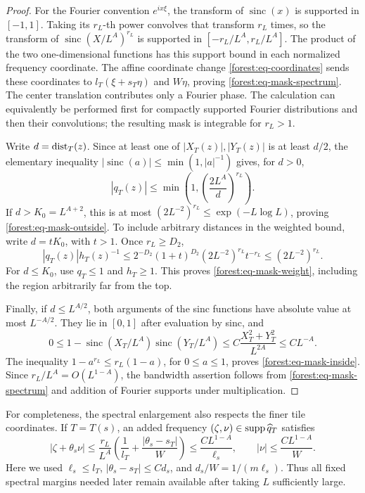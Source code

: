 \begin{proof}
For the Fourier convention \(e^{ix\xi}\), the transform of
\(\operatorname{sinc}(x)\) is supported in \([-1,1]\).
Taking its \(r_L\)-th power convolves that transform \(r_L\)
times, so the transform of
\(\operatorname{sinc}(X/L^A)^{r_L}\) is supported in
\([-r_L/L^A,r_L/L^A]\). The product of the two one-dimensional
functions has this support bound in each normalized frequency
coordinate. The affine coordinate change
\eqref{forest:eq-coordinates} sends these coordinates to
\(l_T(\xi+s_T\eta)\) and \(W\eta\), proving
\eqref{forest:eq-mask-spectrum}. The center translation contributes
only a Fourier phase. The calculation can equivalently be performed
first for compactly supported Fourier distributions and then their
convolutions; the resulting mask is integrable for \(r_L>1\).

Write \(d=\operatorname{dist}_T(z)\). Since at least one of
\(|X_T(z)|,|Y_T(z)|\) is at least \(d/2\), the elementary
inequality \(|\operatorname{sinc}(a)|\le\min(1,|a|^{-1})\)
gives, for \(d>0\),
\begin{equation}\label{forest:eq-mask-pointwise}
 |q_T(z)|\le\min\left(1,\left(\frac{2L^A}{d}\right)^{r_L}\right).
\end{equation}
If \(d>K_0=L^{A+2}\), this is at most
\((2L^{-2})^{r_L}\le\exp(-L\log L)\), proving
\eqref{forest:eq-mask-outside}. To include arbitrary distances in
the weighted bound, write \(d=tK_0\), with \(t>1\). Once
\(r_L\ge D_2\),
\[
 |q_T(z)|h_T(z)^{-1}
 \le 2^{-D_2}(1+t)^{D_2}
       (2L^{-2})^{r_L}t^{-r_L}
 \le (2L^{-2})^{r_L}.
\]
For \(d\le K_0\), use \(q_T\le1\) and \(h_T\ge1\).
This proves \eqref{forest:eq-mask-weight}, including the region
arbitrarily far from the top.

Finally, if \(d\le L^{A/2}\), both arguments of the sinc
functions have absolute value at most \(L^{-A/2}\). They lie
in \([0,1]\) after evaluation by sinc, and
\[
 0\le1-
   \operatorname{sinc}(X_T/L^A)
   \operatorname{sinc}(Y_T/L^A)
 \le C\frac{X_T^2+Y_T^2}{L^{2A}}
 \le C L^{-A}.
\]
The inequality \(1-a^{r_L}\le r_L(1-a)\), for
\(0\le a\le1\), proves \eqref{forest:eq-mask-inside}.
Since \(r_L/L^A=O(L^{1-A})\), the bandwidth assertion follows
from \eqref{forest:eq-mask-spectrum} and addition of Fourier
supports under multiplication.
\end{proof}

For completeness, the spectral enlargement also respects the finer
tile coordinates. If \(T=T(s)\), an added frequency
\((\zeta,\nu)\in\operatorname{supp}\widehat q_T\) satisfies
\[
 |\zeta+\theta_s\nu|
 \le\frac{r_L}{L^A}
       \left(\frac1{l_T}+\frac{|\theta_s-s_T|}{W}\right)
 \le\frac{C L^{1-A}}{\ell_s},\qquad
 |\nu|\le\frac{C L^{1-A}}{W}.
\]
Here we used \(\ell_s\le l_T\),
\(|\theta_s-s_T|\le Cd_s\), and
\(d_s/W=1/(m\ell_s)\). Thus all fixed spectral margins needed
later remain available after taking \(L\) sufficiently large.
